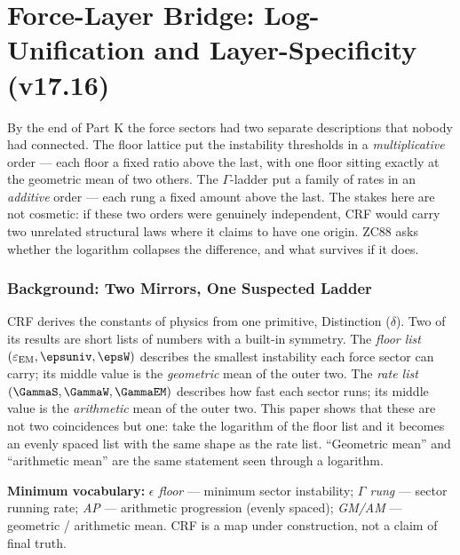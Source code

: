 \documentclass[12pt, a4paper]{article}
\renewcommand{\epsEM}{\varepsilon_{\rm EM}}     %
\begin{document}
\part{Force-Layer Bridge: Log-Unification and Layer-Specificity (v17.16)}
\label{part:LVII}

\noindent
By the end of Part K the force sectors had two separate descriptions that
nobody had connected. The floor lattice put the instability thresholds in a
\emph{multiplicative} order --- each floor a fixed ratio above the last, with
one floor sitting exactly at the geometric mean of two others. The
$\Gamma$-ladder put a family of rates in an \emph{additive} order --- each
rung a fixed amount above the last. The stakes here are not cosmetic: if
these two orders were genuinely independent, CRF would carry two unrelated
structural laws where it claims to have one origin. ZC88 asks whether the
logarithm collapses the difference, and what survives if it does.
\section{Background: Two Mirrors, One Suspected Ladder}
\label{sec:background-zc88}

\begin{keybox}[title={If you are just arriving --- ZC88 in plain language}]
\sloppy
CRF derives the constants of physics from one primitive, Distinction
($\delta$). Two of its results are short lists of numbers with a built-in
symmetry. The \emph{floor list} $(\epsEM,\epsuniv,\epsW)$ describes the
smallest instability each force sector can carry; its middle value is the
\emph{geometric} mean of the outer two. The \emph{rate list}
$(\GammaS,\GammaW,\GammaEM)$ describes how fast each sector runs; its
middle value is the \emph{arithmetic} mean of the outer two. This paper
shows that these are not two coincidences but one: take the logarithm of
the floor list and it becomes an evenly spaced list with the same shape as
the rate list. ``Geometric mean'' and ``arithmetic mean'' are the same
statement seen through a logarithm.

\textbf{Minimum vocabulary:}
\textit{$\epsilon$ floor} --- minimum sector instability;\;
\textit{$\Gamma$ rung} --- sector running rate;\;
\textit{AP} --- arithmetic progression (evenly spaced);\;
\textit{GM/AM} --- geometric / arithmetic mean.
CRF is a map under construction, not a claim of final truth.
\end{keybox}
\end{document}
